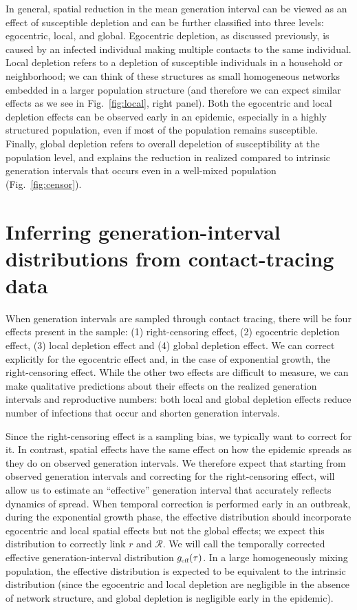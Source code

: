 \documentclass[12pt]{article}
\newcommand{\fref}[1]{Fig.~\ref{fig:#1}}
\newcommand{\RR}{\ensuremath{{\mathcal R}}}
\newcommand{\tsub}[2]{#1_{{\textrm{\tiny #2}}}}
\begin{document}
In general, spatial reduction in the mean generation interval can be viewed as an effect of susceptible depletion and can be further classified into three levels: egocentric, local, and global.
Egocentric depletion, as discussed previously, is caused by an infected individual making multiple contacts to the same individual.
Local depletion refers to a depletion of susceptible individuals in a household or neighborhood;
we can think of these structures as small homogeneous networks embedded in a larger population structure (and therefore we can expect similar effects as we see in \fref{local}, right panel).
Both the egocentric and local depletion effects can be observed early in an epidemic, especially in a highly structured population, even if most of the population remains susceptible.
Finally, global depletion refers to overall depeletion of susceptibility at the population level, and explains the reduction in realized compared to intrinsic generation intervals that occurs even in a well-mixed population (\fref{censor}). 

\section{Inferring generation-interval distributions from contact-tracing data}

When generation intervals are sampled through contact tracing, there will be four effects present in the sample: (1) right-censoring effect, (2) egocentric depletion effect, (3) local depletion effect and (4) global depletion effect.
We can correct explicitly for the egocentric effect and, in the case of exponential growth, the right-censoring effect.
While the other two effects are difficult to measure, we can make qualitative predictions about their effects on the realized generation intervals and reproductive numbers: 
both local and global depletion effects reduce number of infections that occur and shorten generation intervals.

Since the right-censoring effect is a sampling bias, we typically want to correct for it. 
In contrast, spatial effects have the same effect on how the epidemic spreads as they do on observed generation intervals. 
We therefore expect that starting from observed generation intervals and correcting for the right-censoring effect, will allow us to estimate an ``effective'' generation interval that accurately reflects dynamics of spread. 
When temporal correction is performed early in an outbreak, during the exponential growth phase, the effective distribution should incorporate egocentric and local spatial effects but not the global effects; we expect this distribution to correctly link $r$ and $\RR$. 
We will call the temporally corrected effective generation-interval distribution $\tsub{g}{eff}(\tau)$.
In a large homogeneously mixing population, the effective distribution is expected to be equivalent to the intrinsic distribution (since the egocentric and local depletion are negligible in the absence of network structure, and global depletion is negligible early in the epidemic).
\end{document}
